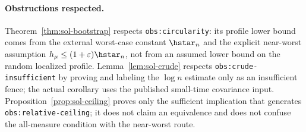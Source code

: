 \documentclass[../main.tex]{subfiles}
\begin{document}
\paragraph{Obstructions respected.}
Theorem~\ref{thm:sol-bootstrap} respects \texttt{obs:circularity}: its profile lower bound comes
from the external worst-case constant $\hstar_n$ and the explicit near-worst assumption
$h_\mu\leq(1+\varepsilon)\hstar_n$, not from an assumed lower bound on the random localized
profile.  Lemma~\ref{lem:sol-crude} respects \texttt{obs:crude-insufficient} by proving and
labeling the $\log n$ estimate only as an insufficient fence; the actual corollary uses the
published small-time covariance input.  Proposition~\ref{prop:sol-ceiling} proves only the
sufficient implication that generates \texttt{obs:relative-ceiling}; it does not claim an
equivalence and does not confuse the all-measure condition with the near-worst route.
\end{document}
